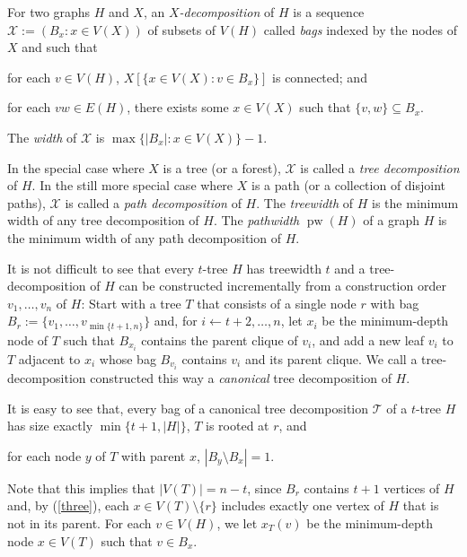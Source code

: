 \documentclass[kpfonts]{patmorin}
\DeclareMathOperator{\pw}{pw}
\theoremstyle{named}
\begin{document}
For two graphs $H$ and $X$, an \emph{$X$-decomposition} of $H$ is a sequence $\mathcal{X}:=(B_x:x\in V(X))$ of subsets of $V(H)$ called \emph{bags} indexed by the nodes of $X$ and such that
 \begin{inparaenum}[(i)]
     \item for each $v\in V(H)$, $X[\{x\in V(X):v\in B_x\}]$ is connected; and
     \item for each $vw\in E(H)$, there exists some $x\in V(X)$ such that $\{v,w\}\subseteq B_x$.
\end{inparaenum}
The \emph{width} of $\mathcal{X}$ is $\max\{|B_x|:x\in V(X)\}-1$.

In the special case where $X$ is a tree (or a forest), $\mathcal{X}$ is called a \emph{tree decomposition} of $H$.  In the still more special case where $X$ is a path (or a collection of disjoint paths), $\mathcal{X}$ is called a \emph{path decomposition} of $H$. The \emph{treewidth} of $H$ is the minimum width of any tree decomposition of $H$. The \emph{pathwidth} $\pw(H)$ of a graph $H$ is the minimum width of any path decomposition of $H$.

It is not difficult to see that every $t$-tree $H$ has treewidth $t$ and a tree-decomposition of $H$ can be constructed incrementally from a construction order $v_1,\ldots,v_n$ of $H$: Start with a tree $T$ that consists of a single node $r$ with bag $B_r:=\{v_1,\ldots,v_{\min\{t+1,n\}}\}$ and, for $i\gets t+2,\ldots,n$, let $x_i$ be the minimum-depth node of $T$ such that $B_{x_i}$ contains the parent clique of $v_i$, and add a new leaf $v_i$ to $T$ adjacent to $x_i$ whose bag $B_{v_i}$ contains $v_i$ and its parent clique.  We call a tree-decomposition constructed this way a \emph{canonical} tree decomposition of $H$.

It is easy to see that, every bag of a canonical tree decomposition $\mathcal{T}$ of a $t$-tree $H$ has size exactly $\min\{t+1,|H|\}$, $T$ is rooted at $r$, and
\begin{inparaenum}[(i)]\setcounter{enumi}{2}
  \item for each node $y$ of $T$ with parent $x$, $|B_y\setminus B_x|=1$.\label{three}
\end{inparaenum}
Note that this implies that $|V(T)|=n-t$, since $B_r$ contains $t+1$ vertices of $H$ and, by (\ref{three}), each $x\in V(T)\setminus\{r\}$ includes exactly one vertex of $H$ that is not in its parent.  For each $v\in V(H)$, we let $x_T(v)$ be the minimum-depth node $x\in V(T)$ such that $v\in B_x$.
\end{document}
